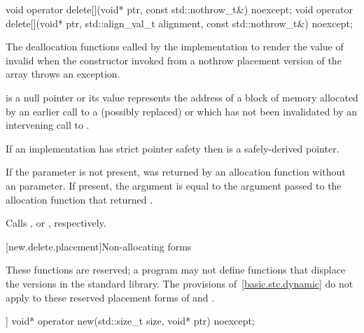 %
\begin{itemdecl}
void operator delete[](void* ptr, const std::nothrow_t&) noexcept;
void operator delete[](void* ptr, std::align_val_t alignment, const std::nothrow_t&) noexcept;
\end{itemdecl}

\begin{itemdescr}
\pnum
\effects
The
deallocation functions
called by the implementation
to render the value of  invalid
when the constructor invoked from a nothrow
placement version of the array  throws an exception.

\pnum
\replaceable
{}

\pnum
\expects
{} is a null pointer or
its value represents the address of
a block of memory allocated by
an earlier call to a (possibly replaced)
or
which has not been invalidated by an intervening call to
.

\pnum
\expects
If an implementation has strict pointer safety
then  is a safely-derived pointer.

\pnum
\expects
If the  parameter is not present,
 was returned by an allocation function
without an  parameter.
If present, the  argument
is equal to the  argument
passed to the allocation function that returned .

\pnum
{}
Calls ,
or ,
respectively.
\end{itemdescr}

[new.delete.placement]{Non-allocating forms}

\pnum
These functions are reserved; a \Cpp{} program may not define functions that displace
the versions in the \Cpp{} standard library.
The provisions of~\ref{basic.stc.dynamic} do not apply to these reserved
placement forms of  and .

%
\begin{itemdecl}
[[nodiscard]] void* operator new(std::size_t size, void* ptr) noexcept;
\end{itemdecl}


